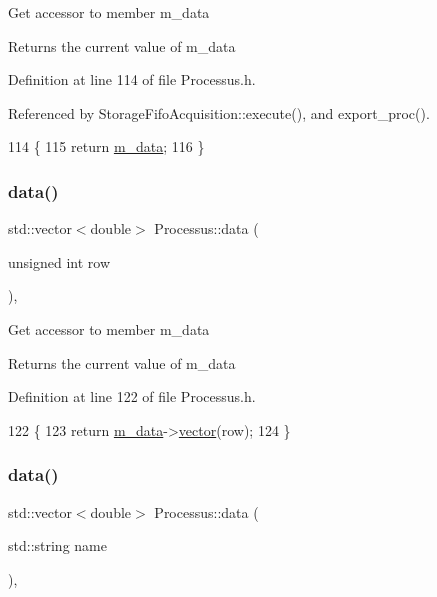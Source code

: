 Get accessor to member m\+\_\+data \begin{DoxyReturn}{Returns}
the current value of m\+\_\+data 
\end{DoxyReturn}


Definition at line 114 of file Processus.\+h.



Referenced by Storage\+Fifo\+Acquisition\+::execute(), and export\+\_\+proc().


\begin{DoxyCode}
114               \{
115     \textcolor{keywordflow}{return} \hyperlink{classProcessus_a3da9a9de8af54e2f47807a3e09dfccff}{m\_data};
116   \}
\end{DoxyCode}
\mbox{\label{classProcessus_aa7c57483cf4b9ab0b2d0ae2de8316402}} 
\subsubsection{\texorpdfstring{data()}{data()}\hspace{0.1cm}{\footnotesize\ttfamily [2/3]}}
{\footnotesize\ttfamily std\+::vector$<$double$>$ Processus\+::data (\begin{DoxyParamCaption}\item[{unsigned int}]{row }\end{DoxyParamCaption})\hspace{0.3cm}{\ttfamily [inline]}, {\ttfamily [inherited]}}

Get accessor to member m\+\_\+data \begin{DoxyReturn}{Returns}
the current value of m\+\_\+data 
\end{DoxyReturn}


Definition at line 122 of file Processus.\+h.


\begin{DoxyCode}
122                                           \{
123     \textcolor{keywordflow}{return} \hyperlink{classProcessus_a3da9a9de8af54e2f47807a3e09dfccff}{m\_data}->\hyperlink{classData_a94e00cdd58c1d6f11487f1ac47fee4bc}{vector}(row);
124   \}
\end{DoxyCode}
\mbox{\label{classProcessus_abf4d91fb36707e1d50178bab12d21ae9}} 
\subsubsection{\texorpdfstring{data()}{data()}\hspace{0.1cm}{\footnotesize\ttfamily [3/3]}}
{\footnotesize\ttfamily std\+::vector$<$double$>$ Processus\+::data (\begin{DoxyParamCaption}\item[{std\+::string}]{name }\end{DoxyParamCaption})\hspace{0.3cm}{\ttfamily [inline]}, {\ttfamily [inherited]}}

